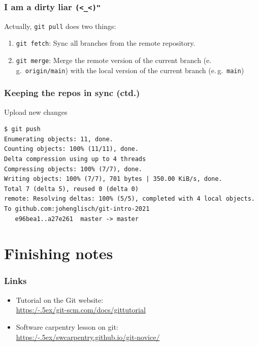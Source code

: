 \documentclass[12pt]{beamer}
\begin{document}
\begin{frame}[fragile]
  \frametitle{I am a dirty liar \texttt{(<\_<)"}}

  Actually, \texttt{git pull} does two things:
  \begin{enumerate}
    \item\texttt{git fetch}: Sync all branches from the remote repository.
    \item\texttt{git merge}: Merge the remote version of the current branch
      (e.\,g.\ \texttt{origin/main}) with the local version of the current
      branch (e.\,g.\ \texttt{main})
  \end{enumerate}
\end{frame}

\begin{frame}[fragile]
  \frametitle{Keeping the repos in sync (ctd.)}

  \begin{block}{Upload new changes}
    {\footnotesize{}%
      \begin{verbatim}
$ git push
Enumerating objects: 11, done.
Counting objects: 100% (11/11), done.
Delta compression using up to 4 threads
Compressing objects: 100% (7/7), done.
Writing objects: 100% (7/7), 701 bytes | 350.00 KiB/s, done.
Total 7 (delta 5), reused 0 (delta 0)
remote: Resolving deltas: 100% (5/5), completed with 4 local objects.
To github.com:johenglisch/git-intro-2021
   e96bea1..a27e261  master -> master
      \end{verbatim}%
    }
  \end{block}
\end{frame}


\section{Finishing notes}

\begin{frame}
  \frametitle{Links}

  \begin{itemize}
    \item Tutorial on the Git website:\\
      \href{https://git-scm.com/docs/gittutorial}%
      {https:/\kern-.5ex/git-scm.com/docs/gittutorial}
    \item Software carpentry lesson on git:\\
      \href{https://swcarpentry.github.io/git-novice/}%
      {https:/\kern-.5ex/swcarpentry.github.io/git-novice/}
  \end{itemize}
\end{frame}
\end{document}
